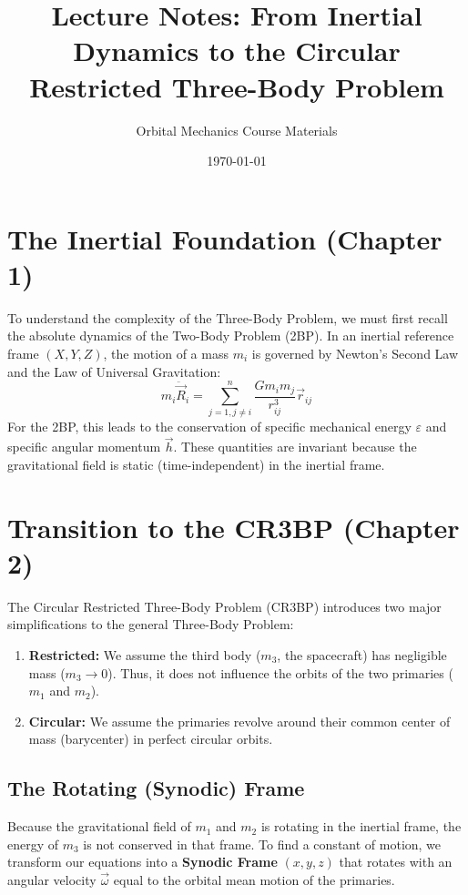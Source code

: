 \documentclass[11pt, letter]{article}
\title{Lecture Notes: From Inertial Dynamics to the Circular Restricted Three-Body Problem}
\author{Orbital Mechanics Course Materials}
\date{\today}
\begin{document}
\maketitle

\section{The Inertial Foundation (Chapter 1)}
To understand the complexity of the Three-Body Problem, we must first recall the absolute dynamics of the Two-Body Problem (2BP). In an inertial reference frame $(X, Y, Z)$, the motion of a mass $m_i$ is governed by Newton's Second Law and the Law of Universal Gravitation:
\begin{equation}
  m_i \ddot{\vec{R}}_i = \sum_{j=1, j \neq i}^{n} \frac{G m_i m_j}{r_{ij}^3} \vec{r}_{ij}
\end{equation}
For the 2BP, this leads to the conservation of specific mechanical energy $\varepsilon$ and specific angular momentum $\vec{h}$. These quantities are invariant because the gravitational field is static (time-independent) in the inertial frame.

\section{Transition to the CR3BP (Chapter 2)}
The Circular Restricted Three-Body Problem (CR3BP) introduces two major simplifications to the general Three-Body Problem:
\begin{enumerate}
\item \textbf{Restricted:} We assume the third body ($m_3$, the spacecraft) has negligible mass ($m_3 \to 0$). Thus, it does not influence the orbits of the two primaries ($m_1$ and $m_2$).
\item \textbf{Circular:} We assume the primaries revolve around their common center of mass (barycenter) in perfect circular orbits.
\end{enumerate}

\subsection{The Rotating (Synodic) Frame}
Because the gravitational field of $m_1$ and $m_2$ is rotating in the inertial frame, the energy of $m_3$ is not conserved in that frame. To find a constant of motion, we transform our equations into a \textbf{Synodic Frame} $(x, y, z)$ that rotates with an angular velocity $\vec{\omega}$ equal to the orbital mean motion of the primaries.
\end{document}
